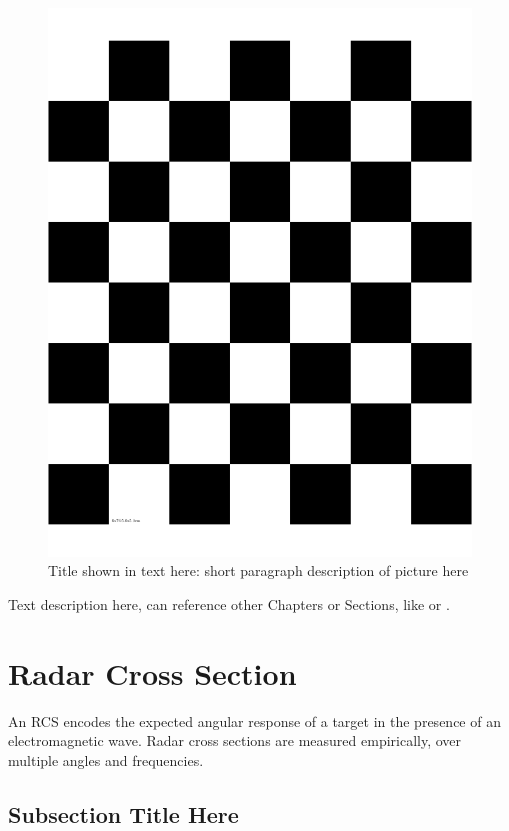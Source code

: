 \begin{figure}[tb!]
	\centering
	\includegraphics[width = 0.75\columnwidth]{Figures/checkerboard7x6x50x50cm.png}
	\caption[TOC Figure Name]{Title shown in text here: short paragraph description of picture here}
	\label{fig:examplePicture}
\end{figure}

Text description here, can reference other Chapters or Sections, like  or .

\section{Radar Cross Section}
\label{sec:RCS}

An RCS encodes the expected angular response of a target in the presence of an electromagnetic wave. Radar cross sections are measured empirically, over multiple angles and frequencies.

\subsection[Optional TOC Subsection Title Here]{Subsection Title Here}
\label{sec:subsectionRefNameHere}


